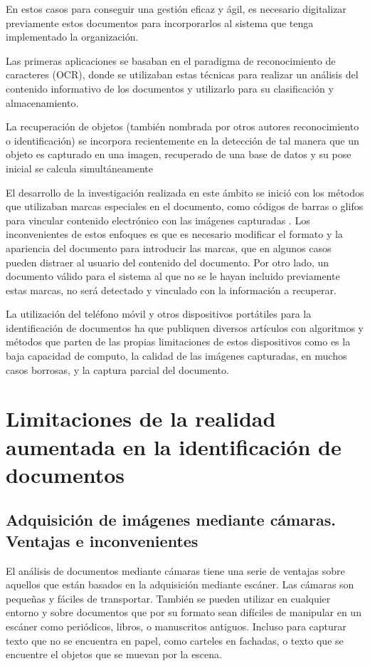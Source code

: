 En estos casos para conseguir una gestión eficaz y ágil, es necesario digitalizar previamente estos documentos para incorporarlos al sistema que tenga implementado la organización.

Las primeras aplicaciones se basaban en el paradigma de reconocimiento de caracteres (OCR), donde se utilizaban estas técnicas para realizar un análisis del contenido informativo de los documentos y utilizarlo para su clasificación y almacenamiento. 

La recuperación de objetos (también nombrada por otros autores reconocimiento o identificación) se incorpora recientemente en la detección de tal manera que un objeto es capturado en una imagen, recuperado de una base de datos y su pose inicial se calcula simultáneamente \cite{Pilet}

El desarrollo de la investigación realizada en este ámbito se inició con los métodos que utilizaban marcas especiales en el documento, como códigos de barras \cite{Graham} o glifos para vincular contenido electrónico con las imágenes capturadas \cite{Hecht}. Los inconvenientes de estos enfoques es que es necesario modificar el formato y la apariencia del documento para introducir las marcas, que en algunos casos pueden distraer al usuario del contenido del documento. Por otro lado, un documento válido para el sistema al que no se le hayan incluido previamente estas marcas, no será detectado y vinculado con la información a recuperar.

La utilización del teléfono móvil y otros dispositivos portátiles para la identificación de documentos ha  que publiquen diversos artículos con algoritmos y métodos que parten de las propias limitaciones de estos dispositivos como es la baja capacidad de computo, la calidad de las imágenes capturadas, en muchos casos borrosas, y la captura parcial del documento.

\section{Limitaciones de la realidad aumentada en la identificación de documentos}
\subsection{Adquisición de imágenes mediante cámaras. Ventajas e inconvenientes}
El análisis de documentos mediante cámaras tiene una serie de ventajas sobre aquellos que están basados en la adquisición mediante escáner. Las cámaras son pequeñas y fáciles de transportar. También se pueden utilizar en cualquier entorno y sobre documentos que por su formato sean difíciles de manipular en un escáner como periódicos, libros, o manuscritos antiguos. Incluso para capturar texto que no se encuentra en papel, como carteles en fachadas, o texto que se encuentre el objetos que se muevan por la escena.

